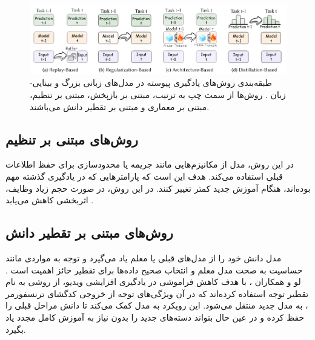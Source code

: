 \begin{figure}
\centering\includegraphics[scale=.45]{Images/Chapter2/llm_methods.png}
\caption[طبقه‌بندی روش‌های یادگیری پیوسته در مدل‌های زبانی بزرگ و بینایی-زبان]{طبقه‌بندی روش‌های یادگیری پیوسته در مدل‌های زبانی بزرگ و بینایی-زبان  \protect\cite{llm_continual}.
روش‌ها از سمت چپ به ترتیب، مبتنی بر بازپخش، مبتنی بر تنظیم، مبتنی بر معماری و مبتنی بر تقطیر دانش می‌باشند. 
}
\label{fig.21}
\end{figure}


\subsection{روش‌های مبتنی بر تنظیم}
در این روش، مدل از مکانیزم‌هایی مانند جریمه یا محدودسازی برای حفظ اطلاعات قبلی استفاده می‌کند. هدف این است که پارامتر‌هایی که در یادگیری گذشته مهم بوده‌اند، هنگام آموزش جدید کمتر تغییر کنند. در این روش، در صورت حجم زیاد وظایف، اثربخشی کاهش می‌یابد
\cite{llm_continual}
.

\subsection{روش‌های مبتنی بر تقطیر دانش}
مدل دانش خود را از مدل‌های قبلی یا معلم یاد می‌گیرد و توجه به مواردی مانند حساسیت به صحت مدل معلم و انتخاب صحیح داده‌ها برای تقطیر حائز اهمیت است
\cite{llm_continual}.
لو و همکاران 
\cite{distillation}،
با هدف کاهش فراموشی در یادگیری افزایشی ویدیو، از روشی به نام تقطیر توجه  استفاده کرده‌اند که در آن ویژگی‌های توجه از خروجی کدگشای ترنسفورمر ، به مدل جدید منتقل می‌شود. این رویکرد به مدل کمک می‌کند تا دانش مراحل قبلی را حفظ کرده و در عین حال بتواند دسته‌های جدید را بدون نیاز به آموزش کامل مجدد یاد بگیرد. 


